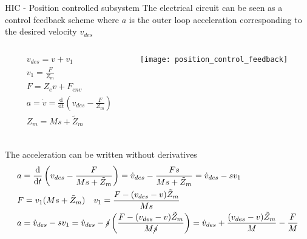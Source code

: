 \begin{frame}[shrink=30]{HIC - Position controlled subsystem}
  The electrical circuit \alert{can be seen as a control feedback scheme where $a$ is the \alert outer loop
  acceleration} corresponding to the desired velocity $v_{des}$
  \begin{columns}
    \begin{column}{0.4\textwidth}
      \begin{align*}
        &v_{des} = v + v_1\\
        &v_1 = \frac{F}{Z_m}\\ 
        &F = Z_e v + F_{env}\\
        &a = \dot{v} = \frac{\mathrm{d}}{\mathrm{d}t} \left(v_{des} - \frac{F}{Z_m} \right)\\
        &Z_m = M s + \tilde{Z}_m\\
      \end{align*}
    \end{column}
    \begin{column}{0.5\textwidth}
      \centering
      \texttt{[image: position\_control\_feedback]}
    \end{column}
  \end{columns}
  The acceleration can be written \alert{without derivatives}
  \begin{align*}
    &a = \frac{\mathrm{d}}{\mathrm{d}t} \left(v_{des} - \frac{F}{Ms + \tilde{Z}_m} \right) = \dot{v}_{des} - \frac{Fs}{Ms + \tilde{Z}_{m}} = \dot{v}_{des} - s v_1 \\
    &F = v_1 (Ms + \tilde{Z}_m) \quad v_1 = \frac{F - (v_{des} - v)\tilde{Z}_m}{Ms}\\
    &a = \dot{v}_{des} - s v_1 = \dot{v}_{des} - \cancel{s} \left( \frac{F - (v_{des} - v)\tilde{Z}_m}{M\cancel{s}} \right) = \dot{v}_{des} + \frac{(v_{des} - v)\tilde{Z}_m}{M} - \frac{F}{M}
  \end{align*}
\end{frame}

